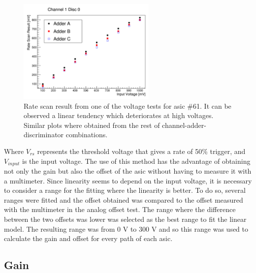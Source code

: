 \documentclass[main.tex]{subfiles}
\begin{document}
\begin{figure}[h]
  \centering
  \includegraphics[width=0.6\textwidth]{./Pictures/linearfit.pdf}
  \caption{Rate scan result from one of the voltage tests for \gls{asic} \#61. It can be observed a linear tendency which deteriorates at high voltages.
    Similar plots where obtained from the rest of channel-adder-discriminator combinations. }
  \label{fig:linearfit}
\end{figure}

Where $V_{rs}$ represents the threshold voltage that gives a rate of 50\% trigger, and $V_{input}$ is the input voltage. The use of this method has the advantage of obtaining not only the gain but also the offset of the \gls{asic} without having to measure it with a multimeter. Since linearity seems to depend on the input voltage, it is necessary to consider a range for the fitting where the linearity is better. To do so, several ranges were fitted and the offset obtained was compared to the offset measured with the multimeter in the analog offset test. The range where the difference between the two offsets was lower was selected as the best range to fit the linear model. The resulting range was from 0 V to 300 V and so this range was used to calculate the gain and offset for every path of each \gls{asic}.

\subsection{Gain}
\end{document}
